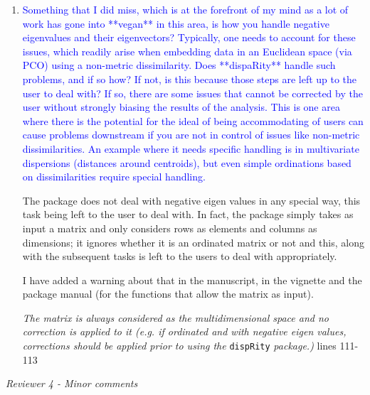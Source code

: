 \documentclass[12pt,letterpaper]{article}
\renewcommand{\subsection}[1]{%
\bigskip
\begin{center}
\begin{large}
\normalfont\itshape #1
\end{large}
\end{center}}
\begin{document}
\begin{enumerate}
\item{\textcolor{blue}{Something that I did miss, which is at the forefront of my mind as a lot of work has gone into **vegan** in this area, is how you handle negative eigenvalues and their eigenvectors?
Typically, one needs to account for these issues, which readily arise when embedding data in an Euclidean space (via PCO) using a non-metric dissimilarity.
Does **dispaRity** handle such problems, and if so how?
If not, is this because those steps are left up to the user to deal with?
If so, there are some issues that cannot be corrected by the user without strongly biasing the results of the analysis.
This is one area where there is the potential for the ideal of being accommodating of users can cause problems downstream if you are not in control of issues like non-metric dissimilarities.
An example where it needs specific handling is in multivariate dispersions (distances around centroids), but even simple ordinations based on dissimilarities require special handling.}}

The package does not deal with negative eigen values in any special way, this task being left to the user to deal with.
In fact, the package simply takes as input a matrix and only considers rows as elements and columns as dimensions; it ignores whether it is an ordinated matrix or not and this, along with the subsequent tasks is left to the users to deal with appropriately.

I have added a warning about that in the manuscript, in the vignette and the package manual (for the functions that allow the matrix as input).

\textit{The matrix is always considered as the multidimensional space and no correction is applied to it (e.g. if ordinated and with negative eigen values, corrections should be applied prior to using the} \texttt{dispRity} \textit{package.)} lines 111-113

\end{enumerate}

\subsection{Reviewer 4 - Minor comments}
\end{document}
